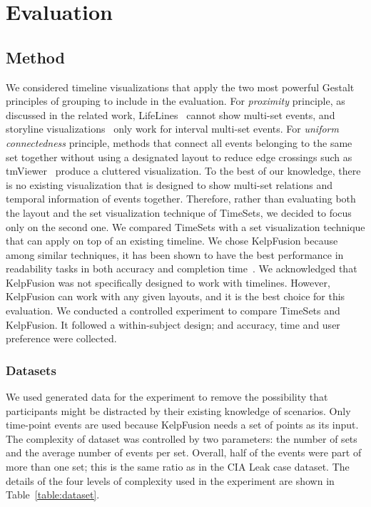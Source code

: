 \section{Evaluation}

\subsection{Method}
We considered timeline visualizations that apply the two most powerful Gestalt principles of grouping to include in the evaluation. For \textit{proximity} principle, as discussed in the related work, LifeLines~\cite{Plaisant1996a} cannot show multi-set events, and storyline visualizations~\cite{Liu2013} only work for interval multi-set events. For \textit{uniform connectedness} principle, methods that connect all events belonging to the same set together without using a designated layout to reduce edge crossings such as tmViewer~\cite{Kumar1998} produce a cluttered visualization. To the best of our knowledge, there is no existing visualization that is designed to show multi-set relations and temporal information of events together. Therefore, rather than evaluating both the layout and the set visualization technique of TimeSets, we decided to focus only on the second one. We compared TimeSets with a set visualization technique that can apply on top of an existing timeline. We chose KelpFusion because among similar techniques, it has been shown to have the best performance in readability tasks in both accuracy and completion time~\cite{Meulemans2013}. We acknowledged that KelpFusion was not specifically designed to work with timelines. However, KelpFusion can work with any given layouts, and it is the best choice for this evaluation. We conducted a controlled experiment to compare TimeSets and KelpFusion. It followed a within-subject design; and accuracy, time and user preference were collected.
 
\subsubsection{Datasets}
We used generated data for the experiment to remove the possibility that participants might be distracted by their existing knowledge of scenarios. Only time-point events are used because KelpFusion needs a set of points as its input. The complexity of dataset was controlled by two parameters: the number of sets and the average number of events per set. Overall, half of the events were part of more than one set; this is the same ratio as in the CIA Leak case dataset. The details of the four levels of complexity used in the experiment are shown in Table~\ref{table:dataset}.

